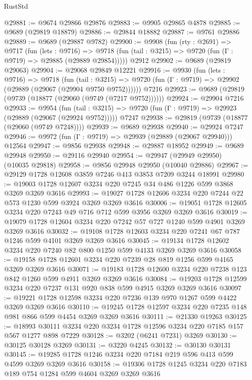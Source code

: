 \begin{lexlean}{RustStd}
\begin{coremodule}
@29881 := @9674 @29866 @29876
@29883 := @9905 @29865 @4878
@29885 := @9689 (@29819 @18879)
@29886 := @29844 @18882
@29887 := @9761 @29886
@29889 := @9689 (@29887 @9782)
@29900 := @9908
    (fun (rty : @2691) =>
    @9717
      (fun (lets : @9716) =>
      @9718 (fun (tail : @3215) => @9720 (fun (Γ : @9719) => @29885 (@29889 @29854)))))
    @2912
@29902 := @9689 (@29819 @29063)
@29904 := @29068 @29849 @12221
@29916 := @9930
    (fun (lets : @9716) =>
    @9718
      (fun (tail : @3215) =>
      @9720 (fun (Γ : @9719) => @29902 (@29889 (@29067 (@29904 @9750 @9752))))))
    @7216
@29923 := @9689 (@29819 (@9739 (@18877 (@29060 (@9749 (@7217 @9752))))))
@29924 := @29904 @7216
@29933 := @9954
    (fun (tail : @3215) => @9720 (fun (Γ : @9719) => @29923 (@29889 (@29067 (@29924 @9752)))))
    @7247
@29938 := @29819 (@9739 (@18877 (@29060 (@9749 @7248))))
@29939 := @9689 @29938
@29940 := @29924 @7247
@29946 := @9972 (fun (Γ : @9719) => @29939 (@29889 (@29067 @29940))) @12564
@29947 := @9856 @29938
@29948 := @29887 @18952
@29949 := @9689 @29948
@29950 := @29116 @29940
@29954 := @29947 (@29949 @29950) (@10035 @29818)
@29958 := @9856 @29948 @29950 (@10040 @29886)
@29967 := @29129 @1728 @12608 @3859 @7246 @413 @3853 @7209 @3244 @18991
@29980 := @19003 @1728 @12607 @3234 @220 @7245 @34 @486 @1226 @599 @3868 @3269 @3269 @3616
@29993 := @19027 @1728 @12606 @3234 @220 @7244 @22 @573 @1230 @599 @3924 @3269 @3269 @3616
@30006 := @19051 @1728 @12605 @3234 @220 @7243 @49 @716 @712 @599 @3956 @3269 @3269 @3616
@30019 := @19079 @1728 @12604 @3234 @220 @7242 @57 @727 @1240 @599 @4901 @3269 @3269 @3616
@30032 := @19108 @1728 @12603 @3234 @220 @7241 @67 @787 @1246 @599 @4101 @3269 @3269 @3616
@30045 := @19134 @1728 @12602 @3234 @220 @7240 @82 @800 @1250 @599 @4133 @3269 @3269 @3616
@30058 := @19158 @1728 @12601 @3234 @220 @7239 @28 @819 @1256 @599 @4165 @3269 @3269 @3616
@30071 := @19183 @1728 @12600 @3234 @220 @7238 @123 @842 @1260 @599 @4911 @3269 @3269 @3616
@30084 := @19203 @1728 @12599 @3234 @220 @7237 @131 @920 @838 @599 @4915 @3269 @3269 @3616
@30097 := @19221 @1728 @12598 @3234 @220 @7236 @139 @970 @1267 @599 @4422 @3269 @3269 @3616
@30110 := @19245 @1728 @12597 @3234 @220 @7235 @148 @981 @866 @599 @4454 @3269 @3269 @3616
@30111 := @21330 @19263
@30125 := @18993 @30111 @3234 @220 @3234 @1728 @12596 @3234 @220 @7185 @157 @567 @1277 @898 @7229
@30128 := @3202 (@6241 @7231) @3269
@30130 := @30125 @30128 @3269
@30131 := @3220 @4245
@30132 := @30130 @30131
@30145 := @19285 @1728 @1246 @3234 @220 @7184 @219 @596 @413 @599 @4599 @3269 @3269 @3616
@30158 := @19306 @1728 @1245 @3234 @220 @7183 @189 @754 @1284 @599 @4604 @3269 @3269 @3616

\end{coremodule}
\end{lexlean}
